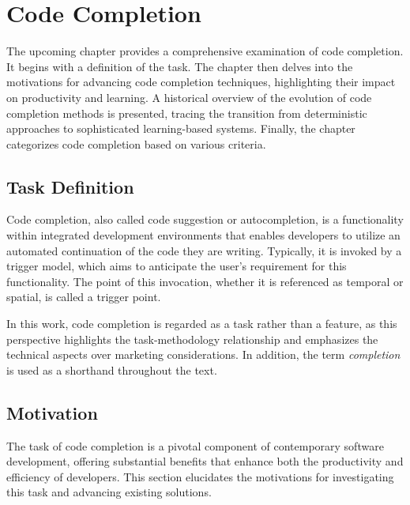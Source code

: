 \chapter{Code Completion}\label{chap:code-completion}

The upcoming chapter provides a comprehensive examination of code completion. It begins with a definition of the task. The chapter then delves into the motivations for advancing code completion techniques, highlighting their impact on productivity and learning. A historical overview of the evolution of code completion methods is presented, tracing the transition from deterministic approaches to sophisticated learning-based systems. Finally, the chapter categorizes code completion based on various criteria.

\section{Task Definition}

Code completion, also called code suggestion or autocompletion, is a functionality within integrated development environments that enables developers to utilize an automated continuation of the code they are writing. Typically, it is invoked by a trigger model, which aims to anticipate the user's requirement for this functionality. The point of this invocation, whether it is referenced as temporal or spatial, is called a trigger point.

In this work, code completion is regarded as a task rather than a feature, as this perspective highlights the task-methodology relationship and emphasizes the technical aspects over marketing considerations. In addition, the term \textit{completion} is used as a shorthand throughout the text.

\section{Motivation}

The task of code completion is a pivotal component of contemporary software development, offering substantial benefits that enhance both the productivity and efficiency of developers. This section elucidates the motivations for investigating this task and advancing existing solutions.

